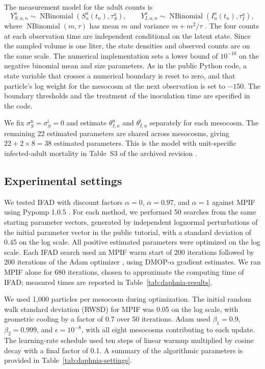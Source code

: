\documentclass[11pt]{article}
\theoremstyle{thmstylethree}%
\begin{document}
The measurement model for the adult counts is
\[
Y_{S,u,n}^a\sim\operatorname{NBinomial}(S_u^a(t_n),\tau_S^a),
\qquad
Y_{I,u,n}^a\sim\operatorname{NBinomial}(I_u^a(t_n),\tau_I^a),
\]
where $\operatorname{NBinomial}(m,\tau)$ has mean $m$ and variance $m+m^2/\tau$ \citep{yang25daphnia}.
The four counts at each observation time are independent conditional on the latent state.
Since the sampled volume is one liter, the state densities and observed counts are on the same scale.
The numerical implementation sets a lower bound of $10^{-10}$ on the negative binomial mean and size parameters.
As in the public Python code, a state variable that crosses a numerical boundary is reset to zero, and that particle's log weight for the mesocosm at the next observation is set to $-150$.
The boundary thresholds and the treatment of the inoculation time are specified in the code.

We fix $\sigma_S^{\mathrm n}=\sigma_S^{\mathrm i}=0$ and estimate $\theta_{I,u}^{\mathrm n}$ and $\theta_{I,u}^{\mathrm i}$ separately for each mesocosm.
The remaining 22 estimated parameters are shared across mesocosms, giving $22+2\times8=38$ estimated parameters.
This is the model with unit-specific infected-adult mortality in Table~S3 of the archived revision \citep{yang26daphniacode}.

\subsection{Experimental settings}

We tested IFAD with discount factors $\alpha=0$, $\alpha=0.97$, and $\alpha=1$ against MPIF using Pypomp 1.0.5 \citep{abkemeier25}.
For each method, we performed 50 searches from the same starting parameter vectors, generated by independent lognormal perturbations of the initial parameter vector in the public tutorial, with a standard deviation of 0.45 on the log scale.
All positive estimated parameters were optimized on the log scale.
Each IFAD search used an MPIF warm start of 200 iterations followed by 200 iterations of the Adam optimizer \citep{kingma15}, using DMOP-$\alpha$ gradient estimates.
We ran MPIF alone for 680 iterations, chosen to approximate the computing time of IFAD; measured times are reported in Table~\ref{tab:daphnia-results}.

We used 1,000 particles per mesocosm during optimization.
The initial random walk standard deviation (RWSD) for MPIF was 0.05 on the log scale, with geometric cooling by a factor of 0.7 over 50 iterations.
Adam used $\beta_1=0.9$, $\beta_2=0.999$, and $\epsilon=10^{-8}$, with all eight mesocosms contributing to each update.
The learning-rate schedule used ten steps of linear warmup multiplied by cosine decay with a final factor of 0.1.
A summary of the algorithmic parameters is provided in Table~\ref{tab:daphnia-settings}.
\end{document}
